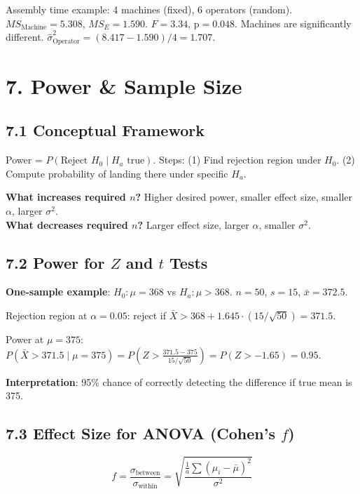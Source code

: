 \documentclass[9pt,letterpaper]{article}
\begin{document}
Assembly time example: 4 machines (fixed), 6 operators (random). $MS_{\text{Machine}}=5.308$, $MS_E=1.590$. $F=3.34$, p$=0.048$. Machines are significantly different. $\hat\sigma^2_{\text{Operator}} = (8.417 - 1.590)/4 = 1.707$.

\section{7. Power \& Sample Size}

\subsection{7.1 Conceptual Framework}

Power = $P(\text{Reject } H_0 \mid H_a \text{ true})$. Steps: (1) Find rejection region under $H_0$. (2) Compute probability of landing there under specific $H_a$.

\begin{keybox}
\textbf{What increases required $n$?} Higher desired power, smaller effect size, smaller $\alpha$, larger $\sigma^2$.\\
\textbf{What decreases required $n$?} Larger effect size, larger $\alpha$, smaller $\sigma^2$.
\end{keybox}

\subsection{7.2 Power for $Z$ and $t$ Tests}

\textbf{One-sample example}: $H_0:\mu=368$ vs $H_a:\mu>368$. $n=50$, $s=15$, $\bar{x}=372.5$.

Rejection region at $\alpha=0.05$: reject if $\bar{X} > 368 + 1.645\cdot(15/\sqrt{50}) = 371.5$.

Power at $\mu=375$: $P(\bar{X}>371.5 \mid \mu=375) = P\!\left(Z > \frac{371.5-375}{15/\sqrt{50}}\right) = P(Z > -1.65) = 0.95$.

\textbf{Interpretation}: 95\% chance of correctly detecting the difference if true mean is 375.

\subsection{7.3 Effect Size for ANOVA (Cohen's $f$)}

\[
f = \frac{\sigma_{\text{between}}}{\sigma_{\text{within}}} = \sqrt{\frac{\frac{1}{a}\sum(\mu_i - \bar\mu)^2}{\sigma^2}}
\]
\end{document}
